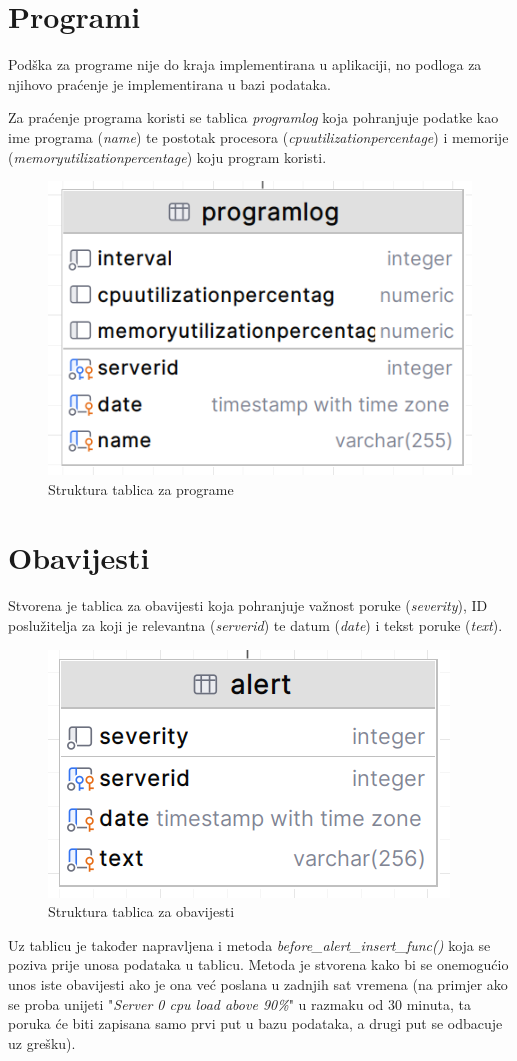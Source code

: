 \documentclass[zavrsnirad]{fer}
\begin{document}
\section{Programi}
Podška za programe nije do kraja implementirana u aplikaciji, no podloga za njihovo praćenje je implementirana u bazi podataka.

Za praćenje programa koristi se tablica \textit{programlog} koja pohranjuje podatke kao ime programa (\textit{name}) te postotak procesora (\textit{cpuutilizationpercentage}) i memorije (\textit{memoryutilizationpercentage}) koju program koristi.

\begin{figure}[htb!]
	\centering
	\includegraphics[width=0.35\linewidth]{images/db_programs.png} 
	\caption{Struktura tablica za programe}
\end{figure}
\FloatBarrier

\section{Obavijesti}
Stvorena je tablica za obavijesti koja pohranjuje važnost poruke (\textit{severity}), ID poslužitelja za koji je relevantna (\textit{serverid}) te datum (\textit{date}) i tekst poruke (\textit{text}).

\begin{figure}[htb!]
	\centering
	\includegraphics[width=0.35\linewidth]{images/db_alerts.png} 
	\caption{Struktura tablica za obavijesti}
\end{figure}
\FloatBarrier

Uz tablicu je također napravljena i metoda \textit{before\_alert\_insert\_func()} koja se poziva prije unosa podataka u tablicu. Metoda je stvorena kako bi se onemogućio unos iste obavijesti ako je ona već poslana u zadnjih sat vremena (na primjer ako se proba unijeti "\textit{Server 0 cpu load above 90\%}" u razmaku od 30 minuta, ta poruka će biti zapisana samo prvi put u bazu podataka, a drugi put se odbacuje uz grešku).
\end{document}

